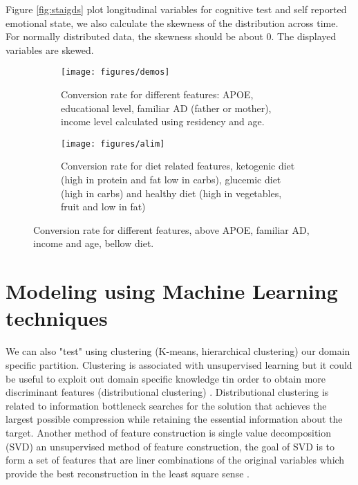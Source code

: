 \documentclass[11pt]{article}
\begin{document}
Figure \ref{fig:staigds} plot longitudinal variables for cognitive test and self reported emotional state, we also calculate the skewness of the distribution across time. For normally distributed data, the skewness should be about 0. The displayed variables are skewed.
\begin{figure}[ht!]
    \centering
    \begin{subfigure}[t]{\textwidth}
        \centering
        \texttt{[image: figures/demos]}
        \caption{Conversion rate for different features: APOE, educational level, familiar AD (father or mother), income level calculated using residency and age.}

    \end{subfigure}
    
    \begin{subfigure}[t]{\textwidth}
        \centering
        \texttt{[image: figures/alim]}
        \caption{Conversion rate for diet related features, ketogenic diet (high in protein and fat low in carbs), glucemic diet (high in carbs) and healthy diet (high in vegetables, fruit and low in fat)}
    \end{subfigure}%
    
    \label{fig:demosalime}
    \caption{Conversion rate for different features, above APOE, familiar AD, income and age, bellow diet.}
\end{figure}



\section{Modeling using Machine Learning techniques} 
\label{se:mod}

We can also "test" using clustering (K-means, hierarchical clustering) our domain specific partition. Clustering is associated with unsupervised learning but it could be useful to exploit out domain specific knowledge tin order to obtain more discriminant features (distributional clustering) \cite{guyon2003introduction}. Distributional clustering is related to information bottleneck \cite{tishby2015deep} searches for the solution that achieves the largest possible compression while retaining the essential information about the target.
Another method of feature construction is single value decomposition (SVD) an unsupervised method of feature construction, the goal of SVD is to form a set of features that are liner combinations of the original variables which provide the best reconstruction in the least square sense \cite{duda2012pattern}.  
\end{document}

